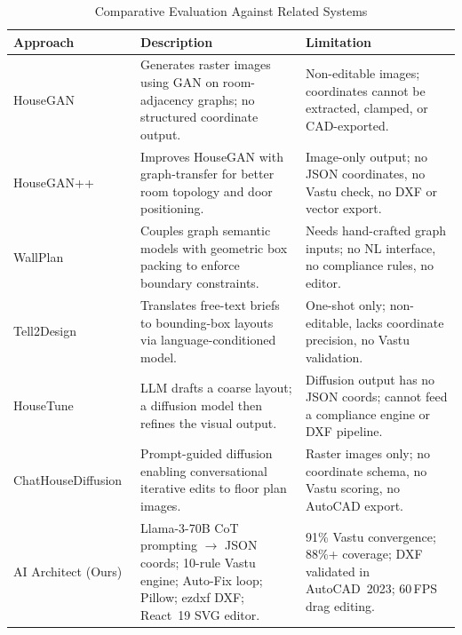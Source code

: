 \documentclass[10pt, twocolumn, letterpaper]{article}
\begin{document}
\begin{table}[!ht]
\caption{Comparative Evaluation Against Related Systems}
\label{tab:results}
\centering
\fontsize{8}{10}\selectfont
\renewcommand{\arraystretch}{1.4}
\begin{tabular}{@{}p{0.85in}p{1.1in}p{1.1in}@{}}
\toprule
\textbf{Approach} & \textbf{Description} & \textbf{Limitation} \\
\midrule

HouseGAN~\cite{houseGAN}
&
Generates raster images using GAN on room-adjacency graphs; no structured coordinate output.
&
Non-editable images; coordinates cannot be extracted, clamped, or CAD-exported. \\[4pt]

HouseGAN++~\cite{houseGANpp}
&
Improves HouseGAN with graph-transfer for better room topology and door positioning.
&
Image-only output; no JSON coordinates, no Vastu check, no DXF or vector export. \\[4pt]

WallPlan~\cite{wallplan}
&
Couples graph semantic models with geometric box packing to enforce boundary constraints.
&
Needs hand-crafted graph inputs; no NL interface, no compliance rules, no editor. \\[4pt]

Tell2Design~\cite{tell2design}
&
Translates free-text briefs to bounding-box layouts via language-conditioned model.
&
One-shot only; non-editable, lacks coordinate precision, no Vastu validation. \\[4pt]

HouseTune~\cite{housetune}
&
LLM drafts a coarse layout; a diffusion model then refines the visual output.
&
Diffusion output has no JSON coords; cannot feed a compliance engine or DXF pipeline. \\[4pt]

ChatHouseDiffusion~\cite{chathousediffusion}
&
Prompt-guided diffusion enabling conversational iterative edits to floor plan images.
&
Raster images only; no coordinate schema, no Vastu scoring, no AutoCAD export. \\[4pt]

AI Architect (Ours)
&
Llama-3-70B CoT prompting $\rightarrow$ JSON coords; 10-rule Vastu engine; Auto-Fix loop; Pillow; ezdxf DXF; React~19 SVG editor.
&
91\% Vastu convergence; 88\%+ coverage; DXF validated in AutoCAD~2023; 60\,FPS drag editing. \\

\bottomrule
\end{tabular}
\end{table}
\end{document}
